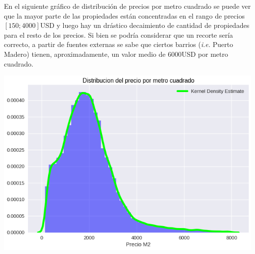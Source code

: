 \documentclass[a4paper, 10pt]{article}
\newcommand\tab[1][0.5cm]{\hspace*{#1}}
\begin{document}
				\tab En el siguiente gráfico de distribución de precios por metro cuadrado se puede ver que la mayor parte
				de las propiedades están concentradas en el rango de precios $[150;4000]$USD y luego hay un drástico decaimiento
				de cantidad de propiedades para el resto de los precios. Si bien se podría considerar que un recorte sería
				correcto, a partir de fuentes externas se sabe que ciertos barrios (\emph{i.e.} Puerto Madero) tienen,
				aproximadamente, un valor medio de $6000$USD por metro cuadrado.
				\begin{center}
       				\includegraphics[width=\textwidth]{images/m2Histogram}
		   		\end{center}
\end{document}
